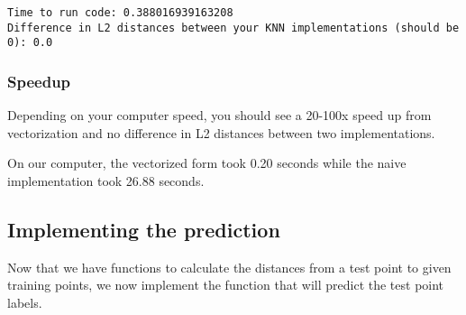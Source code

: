 \documentclass[11pt]{article}
\begin{document}
    \begin{Verbatim}[commandchars=\\\{\}]
Time to run code: 0.388016939163208
Difference in L2 distances between your KNN implementations (should be 0): 0.0

    \end{Verbatim}

    \hypertarget{speedup}{%
\subsubsection{Speedup}\label{speedup}}

Depending on your computer speed, you should see a 20-100x speed up from
vectorization and no difference in L2 distances between two
implementations.

On our computer, the vectorized form took 0.20 seconds while the naive
implementation took 26.88 seconds.

    \hypertarget{implementing-the-prediction}{%
\subsection{Implementing the
prediction}\label{implementing-the-prediction}}

Now that we have functions to calculate the distances from a test point
to given training points, we now implement the function that will
predict the test point labels.
\end{document}
